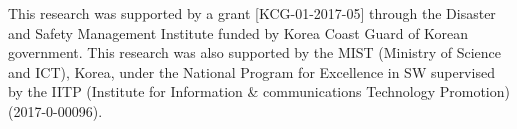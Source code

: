 \documentclass[format=sigconf]{acmart}
\begin{document}


\maketitle



\begin{acks}
  \footnotesize
  \linespread{0.5}
  This research was supported by a grant [KCG-01-2017-05] through the Disaster and Safety Management Institute funded by Korea Coast Guard of Korean government. This research was also supported by the MIST (Ministry of Science and ICT), Korea, under the National Program for Excellence in SW supervised by the IITP (Institute for Information \& communications Technology Promotion)(2017-0-00096).
  \par
\end{acks}



\end{document}
